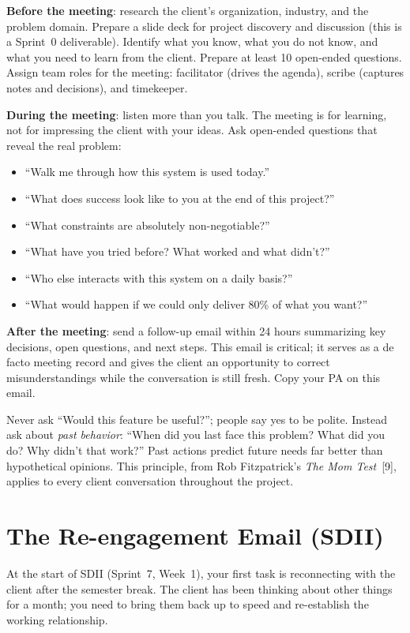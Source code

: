 \textbf{Before the meeting}: research the client's organization, industry, and the problem domain. Prepare a slide deck for project discovery and discussion (this is a Sprint~0 deliverable). Identify what you know, what you do not know, and what you need to learn from the client. Prepare at least 10 open-ended questions. Assign team roles for the meeting: facilitator (drives the agenda), scribe (captures notes and decisions), and timekeeper.

\textbf{During the meeting}: listen more than you talk. The meeting is for learning, not for impressing the client with your ideas. Ask open-ended questions that reveal the real problem:
\begin{itemize}[nosep,leftmargin=1.5em]
\item ``Walk me through how this system is used today.''
\item ``What does success look like to you at the end of this project?''
\item ``What constraints are absolutely non-negotiable?''
\item ``What have you tried before? What worked and what didn't?''
\item ``Who else interacts with this system on a daily basis?''
\item ``What would happen if we could only deliver 80\% of what you want?''
\end{itemize}

\textbf{After the meeting}: send a follow-up email within 24 hours summarizing key decisions, open questions, and next steps. This email is critical; it serves as a de facto meeting record and gives the client an opportunity to correct misunderstandings while the conversation is still fresh. Copy your PA on this email.

\begin{tipbox}
Never ask ``Would this feature be useful?''; people say yes to be polite. Instead ask about \emph{past behavior}: ``When did you last face this problem? What did you do? Why didn't that work?'' Past actions predict future needs far better than hypothetical opinions. This principle, from Rob Fitzpatrick's \emph{The Mom Test}~[9], applies to every client conversation throughout the project.
\end{tipbox}

\section{The Re-engagement Email (SDII)}
At the start of SDII (Sprint~7, Week~1), your first task is reconnecting with the client after the semester break. The client has been thinking about other things for a month; you need to bring them back up to speed and re-establish the working relationship.

